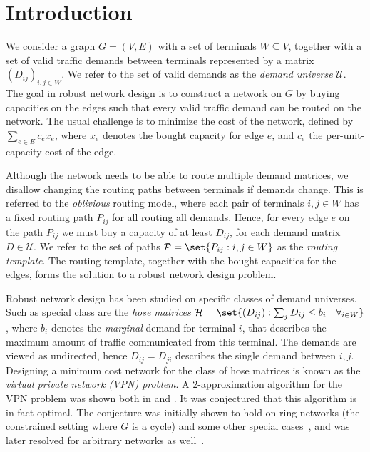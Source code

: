 \documentclass[11pt]{article}
\theoremstyle{definition}
\begin{document}
    \section{Introduction} \label{sec:introduction}
    We consider a graph $G = (V, E)$ with a set of terminals $W \subseteq V$, together with a set of valid traffic demands between terminals represented by a matrix $(D_{ij})_{i,j \in W}$.
    We refer to the set of valid demands as the \emph{demand universe} $\mathcal U$.
    The goal in robust network design is to construct a network on $G$ by buying capacities on the edges such that every valid traffic demand can be routed on the network.
    The usual challenge is to minimize the cost of the network, defined by $\sum_{e \in E} c_e x_e$, where $x_e$ denotes the bought capacity for edge $e$, and $c_e$ the per-unit-capacity cost of the edge.

    Although the network needs to be able to route multiple demand matrices, we disallow changing the routing paths between terminals if demands change.
    This is referred to the \emph{oblivious} routing model, where each pair of terminals $i,j \in W$ has a fixed routing path $P_{ij}$ for all routing all demands.
    Hence, for every edge $e$ on the path $P_{ij}$ we must buy a capacity of at least $D_{ij}$, for each demand matrix $D \in \mathcal U$.
    We refer to the set of paths $\mathcal P = \set{P_{ij} : i,j \in W}$ as the \emph{routing template}.
    The routing template, together with the bought capacities for the edges, forms the solution to a robust network design problem.

    Robust network design has been studied on specific classes of demand universes.
    Such as special class are the \emph{hose matrices} $\mathcal H = \set{(D_{ij}) : \sum_j D_{ij} \le b_i \quad \forall_{i \in W}}$, where $b_i$ denotes the \emph{marginal} demand for terminal $i$, that describes the maximum amount of traffic communicated from this terminal.
    The demands are viewed as undirected, hence $D_{ij} = D_{ji}$ describes the single demand between $i,j$.
    Designing a minimum cost network for the class of hose matrices is known as the \emph{virtual private network (VPN) problem}.
    A $2$-approximation algorithm for the VPN problem was shown both in \cite{fingerhut1997designing} and \cite{gupta2001provisioning}.
    It was conjectured \cite{italiano2006design} that this algorithm is in fact optimal.
    The conjecture was initially shown to hold on ring networks (the constrained setting where $G$ is a cycle) and some other special cases~\cite{hurkens2007virtual}, and was later resolved for arbitrary networks as well~\cite{goyal2013vpn}.
\end{document}
